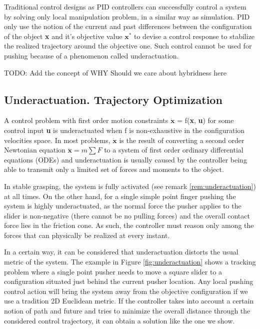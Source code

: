 \documentclass[12,twoside]{TFG-GM}
\theoremstyle{definition}
\theoremstyle{remark}
\begin{document}
Traditional control designs as PID controllers can successfully control a system by solving only local manipulation problem, in a similar way as simulation. PID only use the notion of the current and past differences between the configuration of the object \textbf{x} and it's objective value $\textbf{x}^*$ to devise a control response to stabilize the realized trajectory around the objective one. Such control cannot be used for pushing because of a phenomenon called underactuation.

TODO: Add the concept of WHY Should we care about hybridness here

\label{sec:hybridness}
\subsection{Underactuation. Trajectory Optimization}

A control problem with first order motion constraints $\dot{\textbf{x}}$ = f({\textbf{x}, \textbf{u}}) for some control input \textbf{u} is underactuated when f is non-exhaustive in the configuration velocities space. In most problems, $\dot{\textbf{x}}$ is the result of converting a second order Newtonian equation $\ddot{\textbf{x}} = m\sum F$ to a system of first order ordinary differential equations (ODEs) and underactuation is usually caused by the controller being able to transmit only a limited set of forces and moments to the object.
 
In stable grasping, the system is fully activated (see remark \ref{rem:underactuation}) at all times. On the other hand, for a single simple point finger pushing the system is highly underactuated, as the normal force the pusher applies to the slider is non-negative (there cannot be no pulling forces) and the overall contact force lies in the friction cone. As such, the controller must reason only among the forces that can physically be realized at every instant.

In a certain way, it can be considered that underactuation distorts the usual metric of the system. The example in Figure \ref{fig:underactuation} shows a tracking problem where a single point pusher needs to move a square slider to a configuration situated just behind the current pusher location. Any local pushing control action will bring the system away from the objective configuration if we use a tradition 2D Euclidean metric. If the controller takes into account a certain notion of path and future and tries to minimize the overall distance through the considered control trajectory, it can obtain a solution like the one we show.
\end{document}
